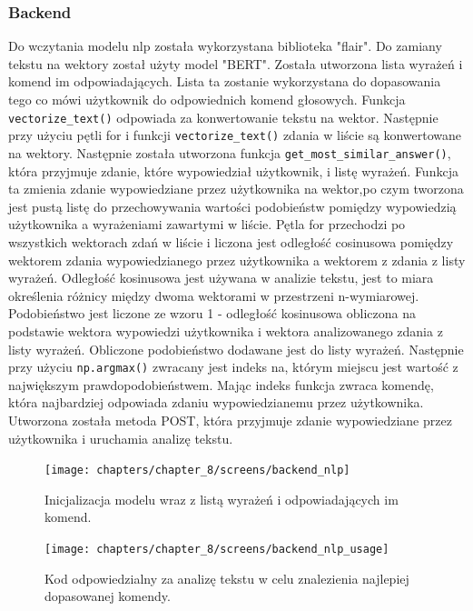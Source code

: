 \subsubsection{Backend}
Do wczytania modelu nlp została wykorzystana biblioteka "flair". Do zamiany tekstu na wektory został użyty model "BERT". Została utworzona lista wyrażeń i komend im odpowiadających. Lista ta zostanie  wykorzystana do dopasowania tego co mówi użytkownik do odpowiednich komend głosowych. Funkcja \texttt{vectorize\_text()} odpowiada za konwertowanie tekstu na wektor. Następnie przy użyciu pętli for i funkcji \texttt{vectorize\_text()} zdania w liście są konwertowane na wektory. Następnie została utworzona funkcja \texttt{get\_most\_similar\_answer()}, która przyjmuje zdanie, które wypowiedział użytkownik, i listę wyrażeń. Funkcja ta zmienia zdanie wypowiedziane przez użytkownika na wektor,po czym tworzona jest pustą listę do przechowywania wartości podobieństw pomiędzy wypowiedzią użytkownika a wyrażeniami zawartymi w liście. Pętla for przechodzi po wszystkich wektorach zdań w liście i liczona jest odległość cosinusowa pomiędzy wektorem zdania wypowiedzianego przez użytkownika a wektorem z zdania z listy wyrażeń. Odległość kosinusowa jest używana w analizie tekstu, jest to miara określenia różnicy między dwoma wektorami w przestrzeni n-wymiarowej.\cite{dataMining} Podobieństwo jest liczone ze wzoru 1 - odległość kosinusowa obliczona na podstawie wektora wypowiedzi użytkownika i wektora analizowanego zdania z listy wyrażeń. Obliczone podobieństwo dodawane jest do listy wyrażeń. Następnie przy użyciu \texttt{np.argmax()} zwracany jest indeks na, którym miejscu jest wartość z największym prawdopodobieństwem. Mając indeks funkcja zwraca komendę, która  najbardziej odpowiada zdaniu wypowiedzianemu przez użytkownika. Utworzona została metoda POST, która przyjmuje zdanie wypowiedziane przez użytkownika i uruchamia analizę tekstu.


\begin{figure}[H]
    \centering
    \texttt{[image: chapters/chapter\_8/screens/backend\_nlp]}
    \caption{Inicjalizacja modelu wraz z listą wyrażeń i odpowiadających im komend.}
    \label{img:backend_nlp}
\end{figure}


\begin{figure}[H]
    \centering
    \texttt{[image: chapters/chapter\_8/screens/backend\_nlp\_usage]}
    \caption{Kod odpowiedzialny za analizę tekstu w celu znalezienia najlepiej dopasowanej komendy.}
    \label{img:backend_nlp_usage}
\end{figure}

